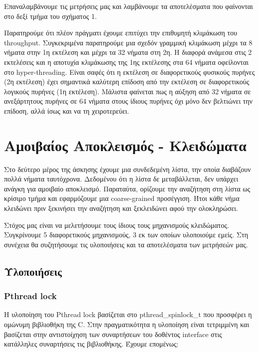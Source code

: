\documentclass[12pt,titlepage]{article}
\begin{document}
Επαναλαμβάνουμε τις μετρήσεις μας και λαμβάνουμε τα αποτελέσματα που φαίνονται
στο δεξί τμήμα του σχήματος 1.

Παρατηρούμε ότι πλέον πράγματι έχουμε επιτύχει την επιθυμητή κλιμάκωση του
throughput. Συγκεκριμένα παρατηρούμε μια σχεδόν γραμμική κλιμάκωση μέχρι τα 8
νήματα στην 1η εκτέλεση και μέχρι τα 32 νήματα στη 2η. Η διαφορά ανάμεσα στις 2
εκτελέσεις και η αποτυχία κλιμάκωσης της 1ης εκτέλεσης στα 64 νήματα οφείλονται
στο hyper-threading. Είναι σαφές ότι η εκτέλεση σε διαφορετικούς φυσικούς
πυρήνες (2η εκτέλεση) έχει σημαντικά καλύτερη επίδοση από την εκτέλεση σε
διαφορετικούς λογικούς πυρήνες (1η εκτέλεση). Μάλιστα φαίνεται πως η αύξηση από
32 νήματα σε ανεξάρτητους πυρήνες σε 64 νήματα στους ίδιους πυρήνες όχι μόνο δεν
βελτιώνει την επίδοση, αλλά ίσως και να τη χειροτερεύει.

\newpage

\section{Αμοιβαίος Αποκλεισμός - Κλειδώματα}

Στο δεύτερο μέρος της άσκησης έχουμε μια συνδεδεμένη λίστα, την οποία διαβάζουν
πολλά νήματα ταυτόχρονα. Δεδομένου ότι η λίστα δε μεταβάλλεται, δεν υπάρχει
ανάγκη για αμοιβαίο αποκλεισμό. Παραταύτα, ορίζουμε την αναζήτηση στη λίστα ως
κρίσιμο τμήμα και εφαρμόζουμε μια coarse-grained προσέγγιση. Ήτοι κάθε νήμα
κλειδώνει πριν ξεκινήσει την αναζήτηση και ξεκλειδώνει αφού την ολοκληρώσει.

Στόχος μας είναι να μελετήσουμε τους ίδιους τους μηχανισμούς κλειδώματος.
Συγκρίνουμε 5 διαφορετικούς μηχανισμούς, 3 εκ των οποίων υλοποιούμε εμείς. Στη
συνέχεια θα συζητήσουμε τις υλοποιήσεις και τα αποτελέσματα των μετρήσεών μας.

\subsection{Υλοποιήσεις}

\subsubsection{Pthread lock}

Η υλοποίηση του Pthread lock βασίζεται στο pthread\_spinlock\_t που προσφέρει η
ομώνυμη βιβλιοθήκη της C. Στην πραγματικότητα η υλοποίηση είναι τετριμμένη και
βασίζεται στην αντιστοίχηση των συναρτήσεων του δοθέντος interface στις
κατάλληλες συναρτήσεις τις βιβλιοθήκης. Έχουμε επομένως:
\end{document}

